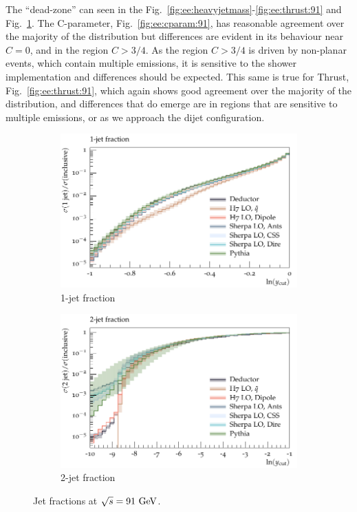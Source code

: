 The \Herwig \QTilde ``dead-zone'' can seen in the
Fig.~\ref{fig:ee:heavyjetmass}-\ref{fig:ee:thrust:91} and
Fig.~\ref{fig:ee:r1:91}.  The C-parameter, Fig.~\ref{fig:ee:cparam:91}, has
reasonable agreement over the majority of the distribution but differences are
evident in its behaviour near $C=0$, and in the region $C>3/4$. As the region
$C>3/4$ is driven by non-planar events, which contain multiple emissions, it
is sensitive to the shower implementation and differences should be expected.
This same is true for Thrust, Fig.~\ref{fig:ee:thrust:91}, which again shows
good agreement over the majority of the distribution, and differences that do
emerge are in regions that are sensitive to multiple emissions, or as we
approach the dijet configuration.
\begin{figure}[h]
  \centering
  \begin{subfigure}[t]{0.49\textwidth}
    \includegraphics[width=1\textwidth]{plots/EE-91-MuShower/MC_EETOJETS/R1.pdf}
    \caption{1-jet fraction}
    \label{fig:ee:r1:91}
  \end{subfigure}
  \begin{subfigure}[t]{0.49\textwidth}
    \includegraphics[width=1\textwidth]{plots/EE-91-MuShower/MC_EETOJETS/R2.pdf}
    \caption{2-jet fraction}
    \label{fig:ee:r2:91}
  \end{subfigure}
  \caption{Jet fractions at $\sqrt{s}=91~\textrm{GeV}$.}
  \label{fig:ee:r:91}
\end{figure}
